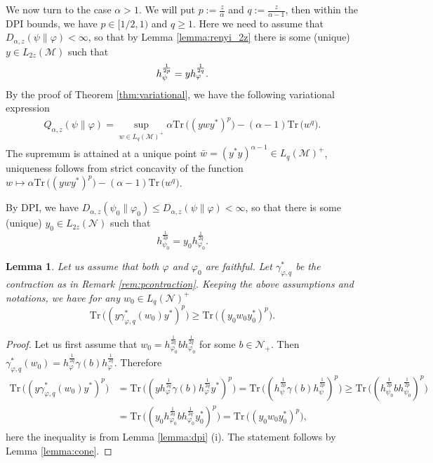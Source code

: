 \documentclass[12pt]{article}
\newtheorem{lemma}[theorem]{Lemma}
\theoremstyle{definition}
\theoremstyle{remark}
\numberwithin{equation}{section}
\def\Me{\mathcal M}
\def\Ne{\mathcal N}
\def \Tr{\mathrm{Tr}\,}
\def\ffi{\varphi}
\begin{document}
We now turn to the case $\alpha>1$. We will put $p:=\frac z\alpha$ and
$q:=\frac z{\alpha-1}$, then within the DPI bounds, we have $p\in [1/2,1)$ and $q\ge 1$. Here we need to assume that
$D_{\alpha,z}(\psi\|\ffi)<\infty$, so that by Lemma \ref{lemma:renyi_2z} there is some
(unique)  $y\in L_{2z}(\Me)$ such that
\[
h_{\psi}^{1\over 2p}=y h_\ffi^{1\over 2q}.
\]
By the proof of Theorem \ref{thm:variational}, we have the following variational
expression
\begin{align}\label{eq:variationalq}
Q_{\alpha,z}(\psi\|\varphi) =\sup_{w\in
L_q(\Me)^+}\alpha\Tr\bigl((ywy^*)^p\bigr)-(\alpha-1)\Tr \bigl(w^q\bigr).
\end{align}
 The supremum is attained at a unique point $\bar
w=(y^*y)^{\alpha-1}\in L_q(\Me)^+$, uniqueness follows from strict concavity of the
function $w\mapsto \alpha\Tr\bigl((ywy^*)^p\bigr)-(\alpha-1)\Tr\bigl( w^q\bigr)$.


By DPI, we have $D_{\alpha,z}(\psi_0\|\varphi_0)\le D_{\alpha,z}(\psi\|\varphi)<\infty$,
so that there is some (unique) $y_0\in L_{2z}(\Ne)$ such that 
\[
h_{\psi_0}^{\frac1{2p}}=y_0h_{\varphi_0}^{\frac1{2q}}.
\]



\begin{lemma}\label{lemma:le} Let us assume that both $\ffi$ and $\ffi_0$ are faithful.
Let $\gamma^*_{\ffi,q}$ be the contraction as in Remark \ref{rem:pcontraction}. Keeping
the above assumptions and notations,   we  have for any $w_0\in
L_q(\Ne)^+$
\[
\Tr\bigl((y\gamma^*_{\ffi,q}(w_0)y^*)^p\bigr)\ge
\Tr \bigl((y_0w_0y_0^*)^p\bigr).
\]

\end{lemma}

\begin{proof} Let us first assume that
$w_0=h_{\varphi_0}^{\frac1{2q}}bh_{\varphi_0}^{\frac1{2q}}$ for some $b\in \Ne_+$. Then 
$\gamma^*_{\varphi,q}(w_0)=h_{\varphi}^{\frac1{2q}}\gamma(b)h_{\varphi}^{\frac1{2q}}$.
Therefore
\begin{align*}
\Tr\bigl((y\gamma^*_{\varphi,q}(w_0)y^*)^p\bigr)&=\Tr\bigl((yh_{\varphi}^{\frac1{2q}}\gamma(b)h_{\varphi}^{\frac1{2q}}y^*)^p\bigr)=
\Tr\bigl((h_\psi^{\frac1{2p}}\gamma(b)h_\psi^{\frac1{2p}})^p\bigr)\ge
\Tr\bigl((h_{\psi_0}^{\frac1{2p}}bh_{\psi_0}^{\frac1{2p}})^p\bigr)\\
&=
\Tr\bigl((y_0h_{\varphi_0}^{\frac1{2q}}bh_{\varphi_0}^{\frac1{2q}}y_0^*)^p\bigr)=\Tr\bigl((y_0w_0y_0^*)^p\bigr),
\end{align*}
here the inequality is from Lemma \ref{lemma:dpi} (i). The statement follows by Lemma
\ref{lemma:cone}.

\end{proof}
\end{document}
